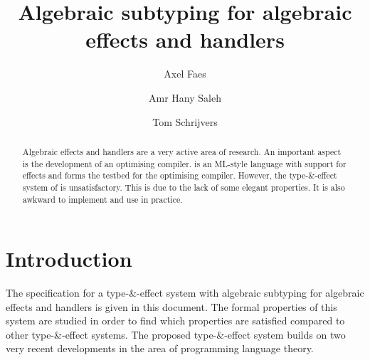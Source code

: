 \documentclass[sigplan,10pt]{acmart}\settopmatter{printfolios=true}
\begin{document}
\title{Algebraic subtyping for algebraic effects and handlers}

\author{Axel Faes}

\author{Amr Hany Saleh}

\author{Tom Schrijvers}


\begin{abstract}
Algebraic effects and handlers are a very active area of research. An important aspect is the development of an optimising compiler. \eff is an ML-style language with support for effects and forms the testbed for the optimising compiler. However, the type-\&-effect system of \eff is unsatisfactory. This is due to the lack of some elegant properties. It is also awkward to implement and use in practice.
\end{abstract}

\maketitle

\section{Introduction}\label{introduction}

The specification for a type-\&-effect system with algebraic subtyping
for algebraic effects and handlers is given in this document. The formal
properties of this system are studied in order to find which properties
are satisfied compared to other type-\&-effect systems. The proposed
type-\&-effect system builds on two very recent developments in the area
of programming language theory.
\end{document}
